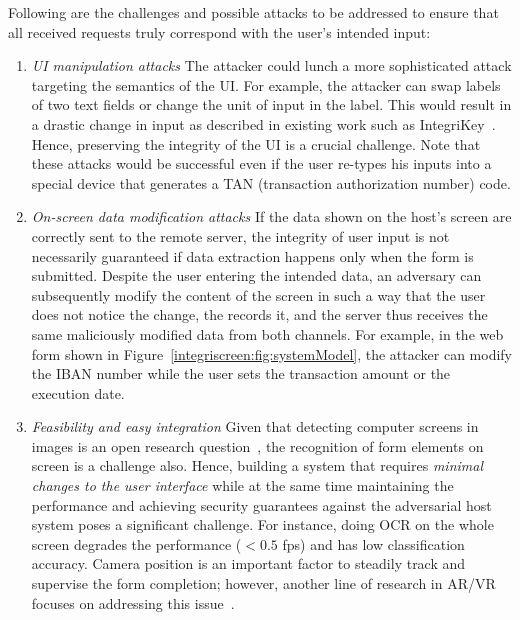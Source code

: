 Following are the challenges and possible attacks to be addressed to ensure that all received requests truly correspond with the user's intended input:

\begin{enumerate}

\item \emph{UI manipulation attacks}
The attacker could lunch a more sophisticated attack targeting the semantics of the UI. For example, the attacker can swap labels of two text fields or change the unit of input in the label. This would result in a drastic change in input as described in existing work such as IntegriKey~\cite{integrikey}. Hence, preserving the integrity of the UI is a crucial challenge. Note that these attacks would be successful even if the user re-types his inputs into a special device that generates a TAN (transaction authorization number) code.


\item \emph{On-screen data modification attacks} If the data shown on the host's screen are correctly sent to the remote server, the integrity of user input is not necessarily guaranteed if data extraction happens only when the form is submitted.
Despite the user entering the intended data, an adversary can subsequently modify the content of the screen in such a way that the user does not notice the change, the \app records it, and the server thus receives the same maliciously modified data from both channels. For example, in the web form shown in Figure~\ref{integriscreen:fig:systemModel}, the attacker can modify the IBAN number while the user sets the transaction amount or the execution date. 

 

\item \emph{Feasibility and easy integration}
Given that detecting computer screens in images is an open research question~\cite{detectingScreens}, the recognition of form elements on screen is a challenge also. Hence, building a system that requires \emph{minimal changes to the user interface} while at the same time maintaining the performance and achieving security guarantees against the adversarial host system poses a significant challenge. For instance, doing OCR on the whole screen degrades the performance ($<0.5$ fps) and has low classification accuracy. Camera position is an important factor to steadily track and supervise the form completion; however, another line of research in AR/VR focuses on addressing this issue~\cite{objectDetectionMobicom19, objectDetectionNIPS15, objectDetectionBD18}.

\end{enumerate}

